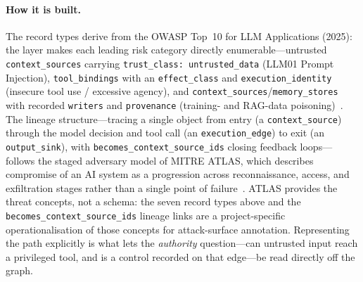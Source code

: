 \documentclass[11pt,a4paper]{article}
\newcommand{\cd}[1]{\lstinline[basicstyle=\ttfamily\small]|#1|}
\begin{document}
\paragraph{How it is built.} The record types derive from the OWASP Top~10 for LLM
Applications (2025): the layer makes each leading risk category directly
enumerable---untrusted \cd{context_sources} carrying \cd{trust_class: untrusted_data}
(LLM01 Prompt Injection), \cd{tool_bindings} with an \cd{effect_class} and
\cd{execution_identity} (insecure tool use / excessive agency), and
\cd{context_sources}/\cd{memory_stores} with recorded \cd{writers} and \cd{provenance}
(training- and RAG-data poisoning)~\citep{owaspllm}. The lineage structure---tracing a
single object from entry (a \cd{context_source}) through the model decision and tool call
(an \cd{execution_edge}) to exit (an \cd{output_sink}), with
\cd{becomes_context_source_ids} closing feedback loops---follows the staged adversary
model of MITRE ATLAS, which describes compromise of an AI system as a progression across
reconnaissance, access, and exfiltration stages rather than a single point of
failure~\citep{atlas}. ATLAS provides the threat concepts, not a schema: the seven record
types above and the \cd{becomes_context_source_ids} lineage links are a project-specific
operationalisation of those concepts for attack-surface annotation. Representing the path
explicitly is what lets the \emph{authority} question---can untrusted input reach a
privileged tool, and is a control recorded on that edge---be read directly off the graph.
\end{document}
